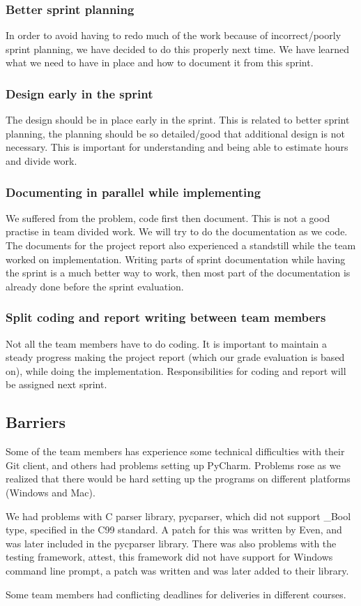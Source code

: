 \subsubsection{Better sprint planning}
In order to avoid having to redo much of the work because of incorrect/poorly
sprint planning, we have decided to do this properly next time. We have learned
what we need to have in place and how to document it from this sprint.

\subsubsection{Design early in the sprint} 
The design should be in place early in the sprint. This is related to better
sprint planning, the planning should be so detailed/good that additional design
is not necessary. This is important for understanding and being able to
estimate hours and divide work.

\subsubsection{Documenting in parallel while implementing}
We suffered from the problem, code first then document. This is not a good
practise in team divided work. We will try to do the documentation as we code.
The documents for the project report also experienced a standstill while the
team worked on implementation. Writing parts of sprint documentation while
having the sprint is a much better way to work, then most part of the
documentation is already done before the sprint evaluation.

\subsubsection{Split coding and report writing between team members} 
Not all the team members have to do coding. It is important to maintain a
steady progress making the project report (which our grade evaluation is based
on), while doing the implementation. Responsibilities for coding and report
will be assigned next sprint. 

\subsection{Barriers}
Some of the team members has experience some technical difficulties with their
Git client, and others had problems setting up PyCharm. Problems rose as we
realized that there would be hard setting up the programs on different
platforms (Windows and Mac).

We had problems with C parser library, pycparser, which did not support \_Bool
type, specified in the C99 standard. A patch for this was written by Even, and
was later included in the pycparser library. There was also problems with the
testing framework, attest, this framework did not have support for Windows
command line prompt, a patch was written and was later added to their library.

Some team members had conflicting deadlines for deliveries in different courses.

